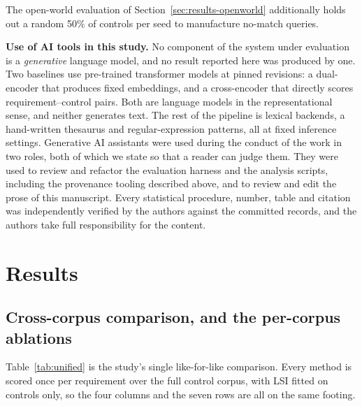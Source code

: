 \documentclass[a4paper,fleqn]{cas-sc}
\begin{document}
The open-world evaluation of Section~\ref{sec:results-openworld} additionally holds out a random 50\% of controls per seed to manufacture no-match queries.

\medskip\noindent\textbf{Use of AI tools in this study.} No component of the system under evaluation is a \emph{generative} language model, and no result reported here was produced by one. Two baselines use pre-trained transformer models at pinned revisions: a dual-encoder that produces fixed embeddings, and a cross-encoder that directly scores requirement--control pairs. Both are language models in the representational sense, and neither generates text. The rest of the pipeline is lexical backends, a hand-written thesaurus and regular-expression patterns, all at fixed inference settings. Generative AI assistants were used during the conduct of the work in two roles, both of which we state so that a reader can judge them. They were used to review and refactor the evaluation harness and the analysis scripts, including the provenance tooling described above, and to review and edit the prose of this manuscript. Every statistical procedure, number, table and citation was independently verified by the authors against the committed records, and the authors take full responsibility for the content.


\section{Results}
\label{sec:results}

\subsection{Cross-corpus comparison, and the per-corpus ablations}
\label{sec:results-unified}

Table~\ref{tab:unified} is the study's single like-for-like comparison. Every method is scored once per requirement over the full control corpus, with LSI fitted on controls only, so the four columns and the seven rows are all on the same footing.
\end{document}
